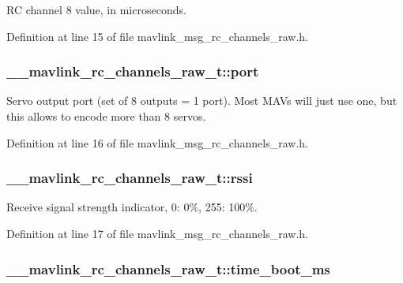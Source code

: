 R\-C channel 8 value, in microseconds. 



Definition at line 15 of file mavlink\-\_\-msg\-\_\-rc\-\_\-channels\-\_\-raw.\-h.

\hypertarget{struct____mavlink__rc__channels__raw__t_a3d166207003ffe9bfc68b3461ae1f03c}{
\subsubsection[{port}]{ \-\_\-\-\_\-mavlink\-\_\-rc\-\_\-channels\-\_\-raw\-\_\-t\-::port}}\label{struct____mavlink__rc__channels__raw__t_a3d166207003ffe9bfc68b3461ae1f03c}


Servo output port (set of 8 outputs = 1 port). Most M\-A\-Vs will just use one, but this allows to encode more than 8 servos. 



Definition at line 16 of file mavlink\-\_\-msg\-\_\-rc\-\_\-channels\-\_\-raw.\-h.

\hypertarget{struct____mavlink__rc__channels__raw__t_a23cda9263105190c2278e2bb1264a886}{
\subsubsection[{rssi}]{ \-\_\-\-\_\-mavlink\-\_\-rc\-\_\-channels\-\_\-raw\-\_\-t\-::rssi}}\label{struct____mavlink__rc__channels__raw__t_a23cda9263105190c2278e2bb1264a886}


Receive signal strength indicator, 0\-: 0\%, 255\-: 100\%. 



Definition at line 17 of file mavlink\-\_\-msg\-\_\-rc\-\_\-channels\-\_\-raw.\-h.

\hypertarget{struct____mavlink__rc__channels__raw__t_aceced8c76bb7171ce4f03c0b633f7a5f}{
\subsubsection[{time\-\_\-boot\-\_\-ms}]{ \-\_\-\-\_\-mavlink\-\_\-rc\-\_\-channels\-\_\-raw\-\_\-t\-::time\-\_\-boot\-\_\-ms}}\label{struct____mavlink__rc__channels__raw__t_aceced8c76bb7171ce4f03c0b633f7a5f}


